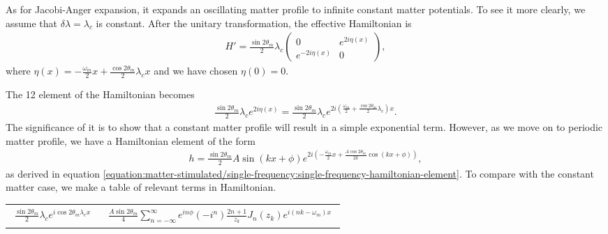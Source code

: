 \documentclass[letterpaper,12pt,english]{sphinxmanual}
\begin{document}
As for Jacobi-Anger expansion, it expands an oscillating matter profile to infinite constant matter potentials. To see it more clearly, we assume that \(\delta\lambda= \lambda_c\) is constant. After the unitary transformation, the effective Hamiltonian is
\begin{equation*}
\begin{split}H' = \frac{\sin 2\theta_m}{2} \lambda_c \begin{pmatrix} 0 & e^{2i\eta(x)} \\ e^{-2i\eta(x)} & 0 \end{pmatrix},\end{split}
\end{equation*}
where \(\eta(x) = -\frac{\omega_m}{2}x + \frac{\cos 2\theta_m}{2}\lambda_c x\) and we have chosen \(\eta(0)=0\).

The 12 element of the Hamiltonian becomes
\begin{equation*}
\begin{split}\frac{\sin 2\theta_m}{2} \lambda_c e^{2i\eta(x)} = \frac{\sin 2\theta_m}{2} \lambda_c e^{2i\left( \frac{\omega_m}{2} + \frac{\cos 2\theta_m}{2} \lambda_c \right)x} .\end{split}
\end{equation*}
The significance of it is to show that a constant matter profile will result in a simple exponential term. However, as we move on to periodic matter profile, we have a Hamiltonian element of the form
\begin{equation*}
\begin{split}h = \frac{\sin 2\theta_m}{2} A \sin (kx+\phi) e^{2i\left( -\frac{\omega_m}{2} x + \frac{A \cos 2\theta_m}{2k} \cos (kx+\phi) \right)},\end{split}
\end{equation*}
as derived in equation \eqref{equation:matter-stimulated/single-frequency:single-frequency-hamiltonian-element}. To compare with the constant matter case, we make a table of relevant terms in Hamiltonian.

\noindent\begin{tabulary}{\linewidth}{|L|L|}
\hline
{}\relax &\relax \\
\hline\begin{equation*}
\begin{split}\frac{\sin 2\theta_m}{2}\lambda_c e^{i \cos 2\theta_m \lambda_c x}\end{split}
\end{equation*}&\begin{equation*}
\begin{split}\frac{A\sin 2\theta_m}{4} \sum_{n=-\infty}^{\infty} e^{in\phi} \left( - i^n \right) \frac{2n+1}{z_k} J_n (z_k) e^{i(nk-\omega_m)x}\end{split}
\end{equation*}\\
\hline\end{tabulary}
\end{document}
